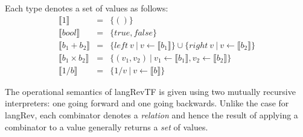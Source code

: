 \documentclass{llncs}
\begin{document}
\begin{definition}
\label{chx:def:denot}
Each type denotes a set of values as follows:
\[\begin{array}{rcl}
\llbracket 1 \rrbracket &=& \{ () \} \\
\llbracket \mathit{bool} \rrbracket &=& \{ \mathit{true}, \mathit{false} \} \\
\llbracket b_1 + b_2 \rrbracket &=& \{ \mathit{left}~v ~|~ v \leftarrow \llbracket b_1 \rrbracket \}
           \cup \{ \mathit{right}~v ~|~ v \leftarrow \llbracket b_2 \rrbracket \} \\
\llbracket b_1 \times b_2 \rrbracket &=& \{ (v_1,v_2) ~|~ v_1 \leftarrow \llbracket b_1 \rrbracket, 
           v_2 \leftarrow \llbracket b_2 \rrbracket \} \\
\llbracket 1/b \rrbracket &=& \{ 1/v ~|~ v \leftarrow \llbracket b \rrbracket \} 
\end{array}\]
\end{definition}

The operational semantics of {{langRevTF}} is given using two mutually
recursive interpreters: one going forward and one going backwards. Unlike the
case for {{langRev}}, each combinator denotes a \emph{relation} and hence the
result of applying a combinator to a value generally returns a \emph{set} of
values. 
\end{document}
